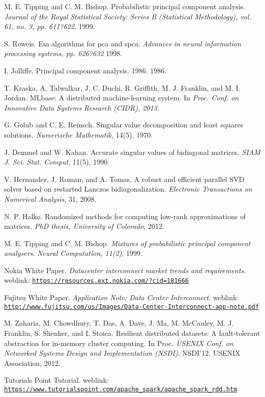 \begin{thebibliography}{1}
M. E. Tipping and C. M. Bishop. Probabilistic principal component analysis. \textit{Journal of the Royal Statistical Society: Series B (Statistical Methodology), vol. 61, no. 3, pp. 611?622}. 1999.

S. Roweis. Em algorithms for pca and spca. \textit{Advances in neural information processing systems, pp. 626?632} 1998.

I. Jolliffe. Principal component analysis. 1986. 1986.

T. Kraska, A. Talwalkar, J. C. Duchi, R. Griffith, M. J.
Franklin, and M. I. Jordan. MLbase: A distributed machine-learning system. In \textit{Proc. Conf. on Innovative Data Systems Research (CIDR), 2013}.

G. Golub and C. E. Reinsch. Singular value decomposition and least squares solutions. \textit{Numerische Mathematik}, 14(5), 1970.

J. Demmel and W. Kahan. Accurate singular values of bidiagonal matrices. \textit{SIAM J. Sci. Stat. Comput}, 11(5), 1990.

V. Hernandez, J. Roman, and A. Tomas. A robust and efficient parallel SVD solver based on restarted Lanczos bidiagonalization. \textit{Electronic Transactions on Numerical Analysis}, 31, 2008.

N. P. Halko. Randomized methods for computing low-rank approximations of matrices. \textit{PhD thesis, University of Colorado}, 2012.

M. E. Tipping and C. M. Bishop. \textit{Mixtures of probabilistic principal component analysers}. \textit{Neural Computation, 11(2)}, 1999.

Nokia White Paper. \textit{Datacenter interconnect market trends and requirements}.
weblink: \texttt{\url{https://resources.ext.nokia.com/?cid=181666}}

Fujitsu White Paper. \textit{Application Note: Data Center Interconnect}.
weblink: \texttt{\url{http://www.fujitsu.com/us/Images/Data-Center-Interconnect-app-note.pdf}}

M. Zaharia, M. Chowdhury, T. Das, A. Dave, J. Ma,
M. McCauley, M. J. Franklin, S. Shenker, and I. Stoica. Resilient distributed datasets: A fault-tolerant abstraction for in-memory cluster computing. In Proc. \textit{USENIX Conf. on Networked Systems Design and Implementation (NSDI)}, NSDI’12. USENIX Association, 2012.

Tutorials Point Tutorial. weblink: \texttt{\url{https://www.tutorialspoint.com/apache_spark/apache_spark_rdd.htm}}
\end{thebibliography}

\endinput